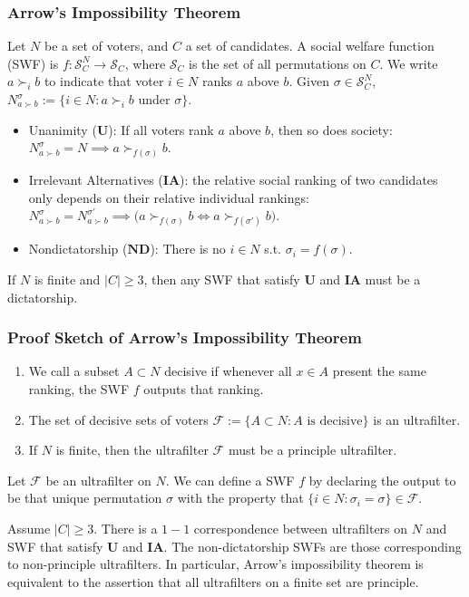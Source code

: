 \documentclass[UTF8,aspectratio=43,11pt,colorlinks,compress,openany]{beamer}%
\begin{document}
\begin{frame}\frametitle{Arrow's Impossibility Theorem}
Let $N$ be a set of voters, and $C$ a set of candidates. A social welfare function (SWF) is $f: \mathcal{S}_C^N\to \mathcal{S}_C$, where $\mathcal{S}_C$ is the set of all permutations on $C$. We write $a\succ_i b$ to indicate that voter $i\in N$ ranks $a$ above $b$. Given $\sigma\in \mathcal{S}_C^N$, $N_{a\succ b}^{\sigma}:=\{i\in N: a\succ_i b \mbox{ under } \sigma\}$.
\begin{itemize}
	\item Unanimity ($\mathbf{U}$): If all voters rank $a$ above $b$, then so does society: $N_{a\succ b}^{\sigma}=N\implies a\succ_{f(\sigma)}b$.
	\item Irrelevant Alternatives ($\mathbf{IA}$): the relative social ranking of two candidates only depends on their relative individual rankings: $N_{a\succ b}^{\sigma}=N_{a\succ b}^{\sigma'}\implies \Big(a\succ_{f(\sigma)}b\iff a\succ_{f(\sigma')}b\Big)$.
	\item Nondictatorship ($\mathbf{ND}$): There is no $i\in N$ s.t. $\sigma_i=f(\sigma)$.
\end{itemize}
\begin{theorem}
If $N$ is finite and $|C|\geq 3$, then any SWF that satisfy $\mathbf{U}$ and $\mathbf{IA}$ must be a dictatorship.
\end{theorem}
\end{frame}

\begin{frame}\frametitle{Proof Sketch of Arrow's Impossibility Theorem}
\begin{enumerate}
	\item We call a subset $A\subset N$ decisive if whenever all $x\in A$ present the same ranking, the SWF $f$ outputs that ranking.
	\item The set of decisive sets of voters $\mathcal{F}:=\{A\subset N: A \mbox{ is decisive}\}$ is an ultrafilter.
	\item If $N$ is finite, then the ultrafilter $\mathcal{F}$ must be a principle ultrafilter.
\end{enumerate}
Let $\mathcal{F}$ be an ultrafilter on $N$. We can define a SWF $f$ by declaring the output to be that unique permutation $\sigma$ with the property that $\{i\in N: \sigma_i=\sigma\}\in \mathcal{F}$.
\begin{theorem}
Assume $|C|\geq 3$. There is a $1-1$ correspondence between ultrafilters on $N$ and SWF that satisfy $\mathbf{U}$ and $\mathbf{IA}$. The non-dictatorship SWFs are those corresponding to non-principle ultrafilters. In particular, Arrow's impossibility theorem is equivalent to the assertion that all ultrafilters on a finite set are principle.
\end{theorem}
\end{frame}
\end{document}
